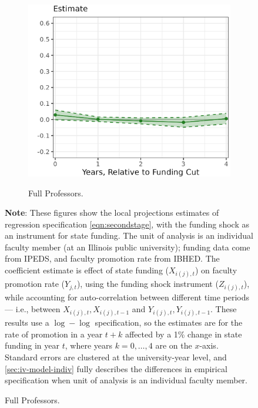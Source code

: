 \begin{figure}[H]
\begin{subfigure}[b]{0.495\textwidth}
        \label{fig:promoted-assistant-illinois-lp-rolling}
    \end{subfigure}
    \begin{subfigure}[b]{0.495\textwidth}
        \centering
        \caption{Full Professors.}
        \includegraphics[width=\textwidth]{figures/promoted-full-illinois-lp-rolling.png}
        \label{fig:promoted-full-illinois-lp-rolling}
    \end{subfigure}
    \label{fig:promoted-illinois-lp-rolling}
    \justify
    \footnotesize
    \textbf{Note}:
    These figures show the local projections estimates of regression specification \eqref{eqn:secondstage}, with the funding shock as an instrument for state funding.
    The unit of analysis is an individual faculty member (at an Illinois public university); funding data come from IPEDS, and faculty promotion rate from IBHED.
    The coefficient estimate is effect of state funding ($X_{i(j),t}$) on faculty promotion rate ($Y_{j,t}$), using the funding shock instrument ($Z_{i(j),t}$), while accounting for auto-correlation between different time periods --- i.e., between $X_{i(j),t}, X_{i(j),t-1}$ and $Y_{i(j),t}, Y_{i(j),t-1}$.
    These results use a $\log-\log$ specification, so the estimates are for the rate of promotion in a year $t+k$ affected by a 1\% change in state funding in year $t$, where years $k = 0, \hdots, 4$ are on the $x$-axis. 
    Standard errors are clustered at the university-year level, and \autoref{sec:iv-model-indiv} fully describes the differences in empirical specification when unit of analysis is an individual faculty member.
\end{figure}

